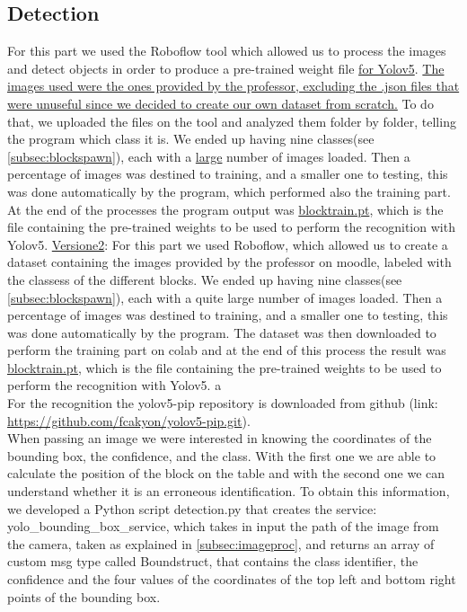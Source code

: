 \documentclass[12pt,a4paper]{article}
\begin{document}
\subsection{Detection}\label{subsec:detect}
For this part we used the Roboflow tool which allowed us to process the images and detect objects in order to produce a pre-trained weight file \uline{for Yolov5}. \uline{The images used were the ones provided by the professor, excluding the .json files that were unuseful since we decided to create our own dataset from scratch.} To do that, we uploaded the files on the tool and analyzed them folder by folder, telling the program which class it is. We ended up having nine classes(see \ref{subsec:blockspawn}), each with a \uline{large} number of images loaded. Then a percentage of images was destined to training, and a smaller one to testing, this was done automatically by the program, which performed also the training part. At the end of the processes the program output was \uline{blocktrain.pt}, which is the file containing the pre-trained weights to be used to perform the recognition with Yolov5. 
\uline{Versione2}: For this part we used Roboflow, which allowed us to create a dataset containing the images provided by the professor on moodle, labeled with the classess of the different blocks. We ended up having nine classes(see \ref{subsec:blockspawn}), each with a quite large number of images loaded. Then a percentage of images was destined to training, and a smaller one to testing, this was done automatically by the program. The dataset was then downloaded to perform the training part on colab and at the end of this process the result was \uline{blocktrain.pt}, which is the file containing the pre-trained weights to be used to perform the recognition with Yolov5. 
a\\
For the recognition the yolov5-pip repository is downloaded from github (link: \url{https://github.com/fcakyon/yolov5-pip.git}).\\
When passing an image we were interested in knowing the coordinates of the bounding box, the confidence, and the class. With the first one we are able to calculate the position of the block on the table and with the second one we can understand whether it is an erroneous identification. To obtain this information, we developed a Python script detection.py that creates the service: yolo\_bounding\_box\_service, which takes in input the path of the image from the camera, taken as explained in \ref{subsec:imageproc}, and returns an array of custom msg type called Boundstruct, that contains the class identifier, the confidence and the four values of the coordinates of the top left and bottom right points of the bounding box.
\end{document}
